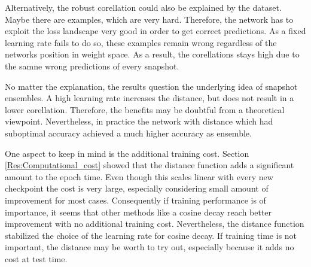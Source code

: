 Alternatively, the robust corellation could also be explained by the dataset. Maybe
there are examples, which are very hard. Therefore, the network has to exploit
the loss landscape very good in order to get correct predictions. As a fixed
learning rate fails to do so, these examples remain wrong regardless of the
networks position in weight space. As a result, the corellations stays high due
to the samne wrong predictions of every snapshot.

No matter the explanation, the results question the underlying idea of snapshot
ensembles. A high learning rate increases the distance, but does not result in a
lower corellation. Therefore, the benefits may be doubtful from a theoretical
viewpoint. Nevertheless, in practice the network with distance which had suboptimal accuracy
achieved a much higher accuracy as ensemble. 
\newline

One aspect to keep in mind is the additional training cost. Section
\ref{Res:Computational_cost} showed that the distance function adds a
significant amount to the epoch time. Even though this scales linear with every
new checkpoint the cost is very large, especially considering small amount of
improvement for most cases. Consequently if training performance is of
importance, it seems that other methods like a cosine decay reach better
improvement with no additional training cost. Nevertheless, the distance
function stabilized the choice of the learning rate for cosine decay. If
training time is not important, the distance may be worth to try out, especially
because it adds no cost at test time.


